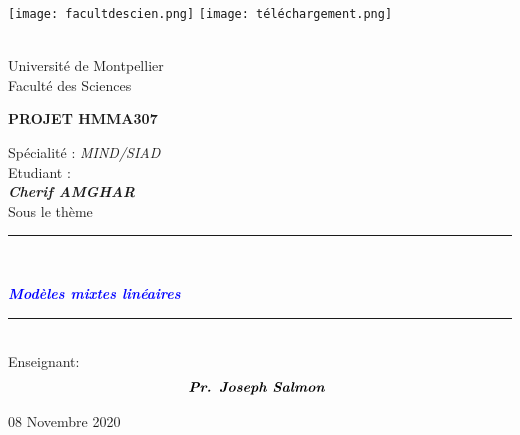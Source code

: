 \documentclass[10pt,a4paper,]{report}
\begin{document}
	\texttt{[image: facultdescien.png]} \hfill{\texttt{[image: téléchargement.png]}}
	\\
	\\
	\begin{center}
		Université de Montpellier\\
		Faculté des Sciences \\
		\vspace*{2.0cm}
		
		\textbf{PROJET HMMA307 }\\
		\vspace{1.5cm}
		
		Spécialité : \textsl{MIND/SIAD} \\
		\vspace{1.5cm}
		Etudiant :\\
	
		\textit{\textbf{ Cherif AMGHAR}}\\
		\vspace*{3cm} 
		Sous le thème 
		\rule{16cm}{4pt}\\
		\begin{cursive}
			\textcolor{blue}{\textbf{\textit{\Large{Modèles mixtes linéaires}}}} 
		\end{cursive}
		\rule{14cm}{3pt}\\
		\vspace*{1.5cm}
		Enseignant: 
		\vspace*{1.5cm}
		$$
		\begin{array}{lll}

        \textit{\textbf{Pr.  Joseph Salmon  }}
	    \end{array}
		$$
		
		
		\vspace*{1cm}
		08 Novembre 2020
	\end{center}
    \newpage

\end{document}
